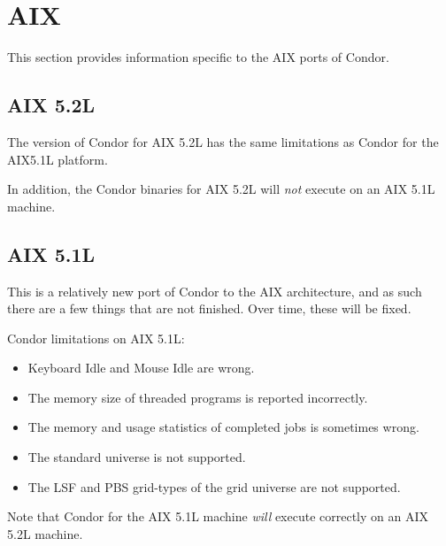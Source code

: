\section{\label{sec:platform-aix}AIX}

This section provides information specific to the AIX ports of
Condor.

\subsection{\label{sec:platform-aix}AIX 5.2L}

The version of Condor for AIX 5.2L has the same limitations as Condor
for the AIX5.1L platform.

In addition, the Condor binaries for AIX 5.2L will \emph{not} execute on an
AIX 5.1L machine.

\subsection{\label{sec:platform-aix}AIX 5.1L}

This is a relatively new port of Condor to the AIX architecture,
and as such there are a few things that are not finished.
Over time, these will be fixed.

Condor limitations on AIX 5.1L:
\begin{itemize}
\item Keyboard Idle and Mouse Idle are wrong.
\item The memory size of threaded programs is reported incorrectly.
\item The memory and usage statistics of completed jobs is sometimes wrong.
\item The standard universe is not supported.
\item The LSF and PBS grid-types of the grid universe are not supported.
\end{itemize}

Note that Condor for the AIX 5.1L machine \emph{will} execute correctly on an
AIX 5.2L machine.

